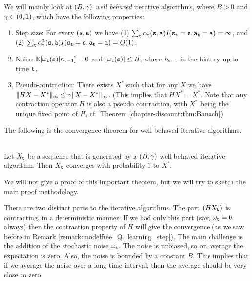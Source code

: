 We will mainly look at {\em $(B,\gamma)$ well behaved} iterative
algorithms, where $B>0$ and $\gamma\in(0,1)$, which have the
following properties:
\begin{enumerate}
\item Step size: For every $({\tt s},{\tt a})$ we have (1) $\sum_{\tt t}
\alpha_{\tt t}({\tt s},{\tt a})
I({\tt s}_{\tt t}={\tt s},{\tt a}_{\tt t}={\tt a})=\infty $, and (2)
$\sum_{\tt t} \alpha_{\tt t}^2({\tt s},{\tt a})
I({\tt s}_{\tt t}={\tt s},{\tt a}_{\tt t}={\tt a})=O(1)$,
\item Noise: $\mathbb{E}[\omega_{\tt t}({\tt s})|h_{{\tt t}-1}]=0$ and $|\omega_{\tt t}({\tt s})|\leq B$, where
$h_{{\tt t}-1}$ is the history up to time ${\tt t}$.
\item Pseudo-contraction: There exists $X^*$ such that for any $X$ we have $\|HX-X^*\|_\infty
\leq \gamma \|X-X^*\|_\infty$. (This implies that $HX^*=X^*$.
Note that any contraction operator $H$ is also a pseudo contraction, with $X^*$ being the unique fixed point of $H$, cf.~Theorem \ref{chapter-discount:thm:Banach})
\end{enumerate}

The following is the convergence theorem for well behaved iterative
algorithms.

\begin{theorem}\ \\
\label{thm:stoch-approx}
 Let $X_{\tt t}$ be a sequence that is generated by a
$(B,\gamma)$ well behaved iterative algorithm. Then $X_{\tt t}$
converges with probability $1$ to $X^*$.
\end{theorem}

We will not give a proof of this important theorem, but we will try
to sketch the main proof methodology.

There are two distinct parts to the iterative algorithms. The part
$(HX_{\tt t})$ is contracting, in a deterministic manner. If we had
only this part (say, $\omega_{\tt t}=0$ always) then the contraction
property of $H$ will give the convergence (as we saw before in Remark \ref{remark:modelfree_Q_learning_step}). The
main challenge is the addition of the stochastic noise $\omega_{\tt t}$. The
noise is unbiased, so on average the expectation is zero. Also, the
noise is bounded by a constant $B$. This implies that if we average
the noise over a long time interval, then the average should be very
close to zero.

